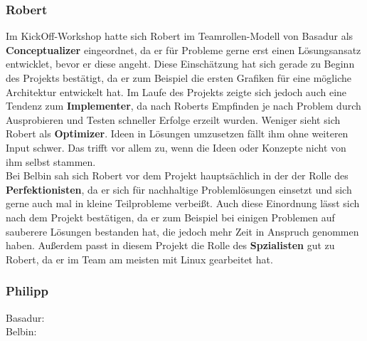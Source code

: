 \documentclass[a4paper,12pt,headsepline]{scrartcl}
\begin{document}
\subsubsection{Robert}
Im KickOff-Workshop hatte sich Robert im Teamrollen-Modell von Basadur als \textbf{Conceptualizer} eingeordnet, da er für Probleme gerne erst einen Lösungsansatz entwicklet, bevor er diese angeht. Diese Einschätzung hat sich gerade zu Beginn des Projekts bestätigt, da er zum Beispiel die ersten Grafiken für eine mögliche Architektur entwickelt hat. Im Laufe des Projekts zeigte sich jedoch auch eine Tendenz zum \textbf{Implementer}, da nach Roberts Empfinden je nach Problem durch Ausprobieren und Testen schneller Erfolge erzeilt wurden. Weniger sieht sich Robert als \textbf{Optimizer}. Ideen in Lösungen umzusetzen fällt ihm ohne weiteren Input schwer. Das trifft vor allem zu, wenn die Ideen oder Konzepte nicht von ihm selbst stammen.\\
Bei Belbin sah sich Robert vor dem Projekt hauptsächlich in der der Rolle des \textbf{Perfektionisten}, da er sich für nachhaltige Problemlösungen einsetzt und sich gerne auch mal in kleine Teilprobleme verbeißt. Auch diese Einordnung lässt sich nach dem Projekt bestätigen, da er zum Beispiel bei einigen Problemen auf sauberere Lösungen bestanden hat, die jedoch mehr Zeit in Anspruch genommen haben. Außerdem passt in diesem Projekt die Rolle des \textbf{Spzialisten} gut zu Robert, da er im Team am meisten mit Linux gearbeitet hat.  
		\subsubsection{Philipp}
		Basadur: \\
		Belbin: 
\end{document}

